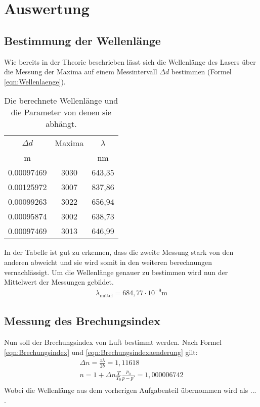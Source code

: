 \section{Auswertung}
\label{sec:Auswertung}
\subsection{Bestimmung der Wellenlänge}
Wie bereits in der Theorie beschrieben lässt sich die Wellenlänge des Lasers über die Messung der Maxima auf einem Messintervall $\Delta d$ bestimmen (Formel \ref{eqn:Wellenlaenge}).
\begin{table}
    \centering
    \begin{tabular}{c c | c }
        \toprule
        $\Delta d $& Maxima & $\lambda$\\
         m &  & nm \\
        \midrule
        0.00097469 & 3030 & 643,35 \\
        0.00125972 & 3007 & 837,86 \\
        0.00099263 & 3022 & 656,94 \\
        0.00095874 & 3002 & 638,73 \\
        0.00097469 & 3013 & 646,99 \\
        \bottomrule
    \end{tabular}
    \caption{Die berechnete Wellenlänge und die Parameter von denen sie abhängt.}
    \label{tab:tab1}
\end{table}
In der Tabelle ist gut zu erkennen, dass die zweite Messung stark von den anderen abweicht und sie wird somit in den weiteren berechnungen vernachlässigt.
Um die Wellenlänge genauer zu bestimmen wird nun der Mittelwert der Messungen gebildet.
\begin{align}
    \lambda_{\text{mittel}} = 684,77 \cdot 10^{-9} \text{m} \nonumber
\end{align}
\subsection{Messung des Brechungsindex}
Nun soll der Brechungsindex von Luft bestimmt werden.
Nach Formel \ref{eqn:Brechungsindex} und \ref{eqn:Brechungsindexaenderung} gilt:
\begin{align}
    \Delta n = \frac{z \lambda}{2 b} = 1,11618 \nonumber \\
    n = 1 + \Delta n \frac{T}{T_0} \frac{p_0}{p-p'} = 1,000006742 \nonumber \\
\end{align}
Wobei die Wellenlänge aus dem vorherigen Aufgabenteil übernommen wird als ... .
